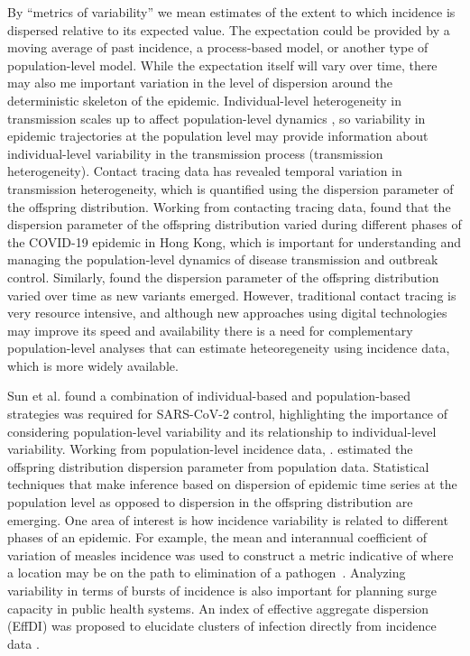 \documentclass[10pt,letterpaper]{article}
\begin{document}
By ``metrics of variability'' we mean estimates of the extent to which incidence is dispersed relative to its expected value.
The expectation could be provided by a moving average of past incidence, a process-based model, or another type of population-level model. 
While the expectation itself will vary over time, there may also me important variation in the level of dispersion around the deterministic skeleton of the epidemic. 
Individual-level heterogeneity in transmission scales up to affect population-level dynamics \cite{lloyd-smith_superspreading_2005}, so variability in epidemic trajectories at the population level may provide information about individual-level variability in the transmission process (transmission heterogeneity).
Contact tracing data has revealed temporal variation in transmission heterogeneity, which is quantified using the dispersion parameter of the offspring distribution.
Working from contacting tracing data, \cite{guo2023statistical} found that the dispersion parameter of the offspring distribution varied during different phases of the COVID-19 epidemic in Hong Kong, which is important for understanding and managing the population-level dynamics of disease transmission and outbreak control.
Similarly, \cite{ko2023time} found the dispersion parameter of the offspring distribution varied over time as new variants emerged. 
However, traditional contact tracing is very resource intensive, and although new approaches using digital technologies may improve its speed and availability \cite{kretzschmar_impact_2020} there is a need for complementary population-level analyses that can estimate heteoregeneity using incidence data, which is more widely available. 

Sun et al. \cite{sun_transmission_2021} found a combination of individual-based and population-based strategies was required for SARS-CoV-2 control, highlighting the importance of considering population-level variability and its relationship to individual-level variability. Working from population-level incidence data, \cite{kirkegaard2021superspreading}.
\cite{kirkegaard2021superspreading} estimated the offspring distribution dispersion parameter from population data.
Statistical techniques that make inference based on dispersion of epidemic time series at the population level as opposed to dispersion in the offspring distribution are emerging.
One area of interest is how incidence variability is related to different phases of an epidemic. For example, the mean and interannual coefficient of variation of measles incidence was used to construct a metric indicative of where a location may be on the path to elimination of a pathogen~\cite{graham_measles_2019}. 
Analyzing variability in terms of bursts of incidence is also important for planning surge capacity in public health systems\cite{wallinga_metropolitan_2018}. 
An index of effective aggregate dispersion (EffDI) was proposed to elucidate clusters of infection directly from incidence data \cite{schneckenreither_assessing_2023}. 
\end{document}
